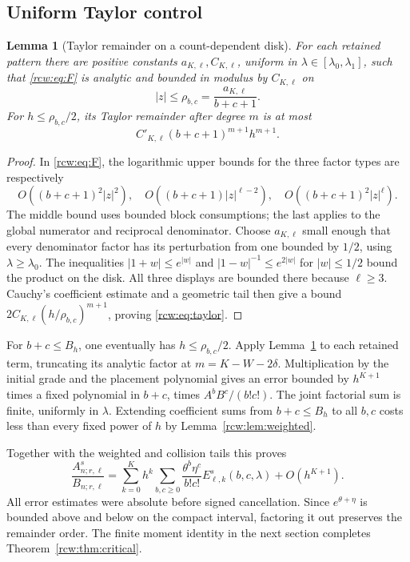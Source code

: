 \documentclass[11pt]{article}
\newtheorem{lemma}[theorem]{Lemma}
\theoremstyle{definition}\newtheorem{definition}[theorem]{Definition}
\theoremstyle{remark}\newtheorem{remark}[theorem]{Remark}
\newcommand{\A}{A^s_{n;r,\ell}}
\newcommand{\B}{B_{n;r,\ell}}
\numberwithin{equation}{section}
\begin{document}
\subsection{Uniform Taylor control}
\begin{lemma}[Taylor remainder on a count-dependent disk]\label{rcw:lem:taylor}
For each retained pattern there are positive constants $a_{K,\ell},C_{K,\ell}$, uniform in $\lambda\in[\lambda_0,\lambda_1]$, such that \eqref{rcw:eq:F} is analytic and bounded in modulus by $C_{K,\ell}$ on
\[
 |z|\le\rho_{b,c}=\frac{a_{K,\ell}}{b+c+1}.
\]
For $h\le\rho_{b,c}/2$, its Taylor remainder after degree $m$ is at most
\begin{equation}\label{rcw:eq:taylor}
 C'_{K,\ell}(b+c+1)^{m+1}h^{m+1}.
\end{equation}
\end{lemma}
\begin{proof}
In \eqref{rcw:eq:F}, the logarithmic upper bounds for the three factor types are respectively
\[
 O((b+c+1)^2|z|^2),\quad
 O((b+c+1)|z|^{\ell-2}),\quad
 O((b+c+1)^2|z|^\ell).
\]
The middle bound uses bounded block consumptions; the last applies to the global numerator and reciprocal denominator. Choose $a_{K,\ell}$ small enough that every denominator factor has its perturbation from one bounded by $1/2$, using $\lambda\ge\lambda_0$. The inequalities $|1+w|\le e^{|w|}$ and $|1-w|^{-1}\le e^{2|w|}$ for $|w|\le1/2$ bound the product on the disk. All three displays are bounded there because $\ell\ge3$. Cauchy's coefficient estimate and a geometric tail then give a bound $2C_{K,\ell}(h/\rho_{b,c})^{m+1}$, proving \eqref{rcw:eq:taylor}.
\end{proof}
For $b+c\le B_h$, one eventually has $h\le\rho_{b,c}/2$. Apply Lemma~\ref{rcw:lem:taylor} to each retained term, truncating its analytic factor at $m=K-W-2\delta$. Multiplication by the initial grade and the placement polynomial gives an error bounded by $h^{K+1}$ times a fixed polynomial in $b+c$, times $A^bB^c/(b!c!)$. The joint factorial sum is finite, uniformly in $\lambda$. Extending coefficient sums from $b+c\le B_h$ to all $b,c$ costs less than every fixed power of $h$ by Lemma~\ref{rcw:lem:weighted}.

Together with the weighted and collision tails this proves
\begin{equation}\label{rcw:eq:sumEk}
 \frac{\A}{\B}
 =\sum_{k=0}^K h^k
  \sum_{b,c\ge0}\frac{\theta^b\eta^c}{b!c!}
       E^s_{\ell,k}(b,c,\lambda)+O(h^{K+1}).
\end{equation}
All error estimates were absolute before signed cancellation. Since $e^{\theta+\eta}$ is bounded above and below on the compact interval, factoring it out preserves the remainder order. The finite moment identity in the next section completes Theorem~\ref{rcw:thm:critical}.
\end{document}
